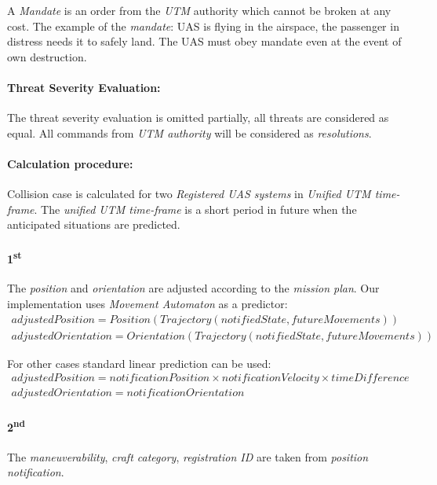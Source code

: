 A \emph{Mandate} is an order from the \emph{UTM} authority which cannot be broken at any cost. The example of the \emph{mandate}: UAS is flying in the airspace, the passenger in distress needs it to safely land. The UAS must obey mandate even at the event of own destruction.

\paragraph{Threat Severity Evaluation:} The threat severity evaluation is omitted partially, all threats are considered as equal. All commands from \emph{UTM authority} will be considered as \emph{resolutions}.

\paragraph{Calculation procedure:} Collision case is calculated for two \emph{Registered UAS systems} in \emph{Unified UTM time-frame}. The \emph{unified UTM time-frame} is a short period in future when the anticipated situations are predicted. 

\paragraph{1\textsuperscript{st}} The \emph{position} and \emph{orientation} are adjusted according to the \emph{mission plan}. Our implementation uses \emph{Movement Automaton} as a predictor:
\begin{equation}
\begin{gathered}
    adjustedPosition = Position(Trajectory(notifiedState, futureMovements))\\
    adjustedOrientation = Orientation(Trajectory(notifiedState, futureMovements))
\end{gathered}
\end{equation}

\noindent For other cases standard linear prediction can be used:
\begin{equation}
    \begin{gathered}
        adjustedPosition = notificationPosition \times notificationVelocity \times timeDifference\\
        adjustedOrientation = notificationOrientation
    \end{gathered}
\end{equation}

\paragraph{2\textsuperscript{nd}} The \emph{maneuverability}, \emph{craft category}, \emph{registration ID} are taken from \emph{position notification}.

